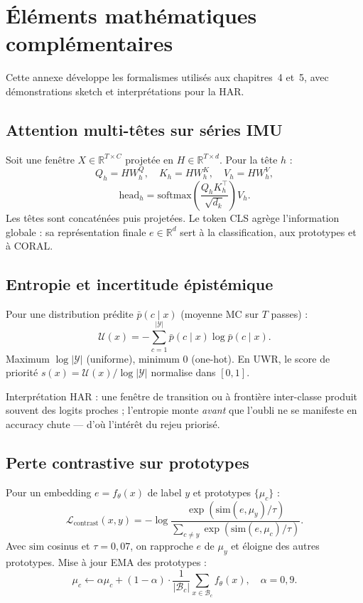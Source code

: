 \documentclass[a4paper,12pt]{report}
\begin{document}
\chapter{Éléments mathématiques complémentaires}
\label{app:math}

Cette annexe développe les formalismes utilisés aux chapitres~4 et~5, avec
démonstrations sketch et interprétations pour la HAR.

\section{Attention multi-têtes sur séries IMU}

Soit une fenêtre $X \in \mathbb{R}^{T \times C}$ projetée en
$H \in \mathbb{R}^{T \times d}$. Pour la tête $h$ :
\[
Q_h = H W^Q_h,\quad K_h = H W^K_h,\quad V_h = H W^V_h,
\]
\[
\mathrm{head}_h = \mathrm{softmax}\!\left(\frac{Q_h K_h^\top}{\sqrt{d_k}}\right) V_h.
\]
Les têtes sont concaténées puis projetées. Le token CLS agrège l'information
globale : sa représentation finale $e \in \mathbb{R}^d$ sert à la classification,
aux prototypes et à CORAL.

\section{Entropie et incertitude épistémique}

Pour une distribution prédite $\bar{p}(c \mid x)$ (moyenne MC sur $T$ passes) :
\[
\mathcal{U}(x) = -\sum_{c=1}^{|\mathcal{Y}|} \bar{p}(c \mid x) \log \bar{p}(c \mid x).
\]
Maximum $\log |\mathcal{Y}|$ (uniforme), minimum $0$ (one-hot). En UWR, le score
de priorité $s(x) = \mathcal{U}(x) / \log |\mathcal{Y}|$ normalise dans $[0,1]$.

Interprétation HAR : une fenêtre de transition ou à frontière inter-classe
produit souvent des logits proches ; l'entropie monte \emph{avant} que l'oubli
ne se manifeste en accuracy chute — d'où l'intérêt du rejeu priorisé.

\section{Perte contrastive sur prototypes}

Pour un embedding $e = f_\theta(x)$ de label $y$ et prototypes $\{\mu_c\}$ :
\[
\mathcal{L}_{\mathrm{contrast}}(x,y) =
-\log \frac{\exp(\mathrm{sim}(e, \mu_y)/\tau)}
{\sum_{c \neq y} \exp(\mathrm{sim}(e, \mu_c)/\tau)}.
\]
Avec $\mathrm{sim}$ cosinus et $\tau = 0{,}07$, on rapproche $e$ de $\mu_y$ et
éloigne des autres prototypes. Mise à jour EMA des prototypes :
\[
\mu_c \leftarrow \alpha \mu_c + (1-\alpha) \cdot \frac{1}{|\mathcal{B}_c|}
\sum_{x \in \mathcal{B}_c} f_\theta(x), \quad \alpha = 0{,}9.
\]
\end{document}
